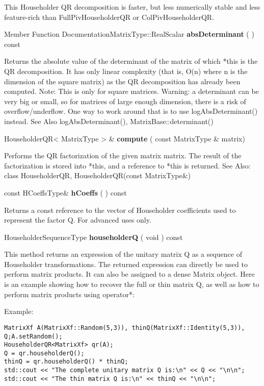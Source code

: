This Householder QR decomposition is faster, but less numerically stable and less feature-rich than \textsf{FullPivHouseholderQR} or \textsf{ColPivHouseholderQR}.


Member Function DocumentationMatrixType::RealScalar \textbf{absDeterminant}  ( )  const 

Returns the absolute value of the determinant of the matrix of which *this is the QR decomposition. It has only linear complexity (that is, O(n) where n is the dimension of the square matrix) as the QR decomposition has already been computed.
Note: This is only for square matrices.
Warning: a determinant can be very big or small, so for matrices of large enough dimension, there is a risk of overflow/underflow. One way to work around that is to use logAbsDeterminant() instead. See Also logAbsDeterminant(), MatrixBase::determinant() 


\vspace{0.3cm}
HouseholderQR< MatrixType > \& \textbf{compute}  ( const MatrixType \&  matrix)   

Performs the QR factorization of the given matrix matrix. The result of the factorization is stored into *this, and a reference to *this is returned.
See Also: class HouseholderQR, HouseholderQR(const MatrixType\&) 


\vspace{0.3cm}
const HCoeffsType\& \textbf{hCoeffs}  ( )  const 

Returns a const reference to the vector of Householder coefficients used to represent the factor Q.
For advanced uses only. 


\vspace{0.3cm}
HouseholderSequenceType \textbf{householderQ}  ( void  )  const 

This method returns an expression of the unitary matrix Q as a sequence of Householder transformations.
The returned expression can directly be used to perform matrix products. It can also be assigned to a dense Matrix object. Here is an example showing how to recover the full or thin matrix Q, as well as how to perform matrix products using operator*:

Example:
\begin{lstlisting}
MatrixXf A(MatrixXf::Random(5,3)), thinQ(MatrixXf::Identity(5,3)), 
Q;A.setRandom();
HouseholderQR<MatrixXf> qr(A);
Q = qr.householderQ();
thinQ = qr.householderQ() * thinQ;
std::cout << "The complete unitary matrix Q is:\n" << Q << "\n\n";
std::cout << "The thin matrix Q is:\n" << thinQ << "\n\n";
\end{lstlisting}

